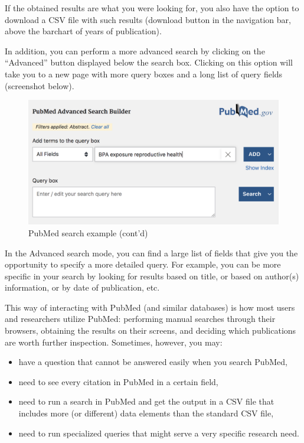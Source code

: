 \documentclass[
]{book}
\begin{document}
If the obtained results are what you were looking for, you also have the option
to download a CSV file with such results (download button in the navigation bar,
above the barchart of years of publication).

In addition, you can perform a more advanced search by clicking on the
``Advanced'' button displayed below the search box. Clicking on this option
will take you to a new page with more query boxes and a long list of query
fields (screenshot below).

\begin{figure}

{\centering \includegraphics[width=0.7\linewidth]{images/api/pubmed-search3} 

}

\caption{PubMed search example (cont'd)}\label{fig:unnamed-chunk-146}
\end{figure}

In the Advanced search mode, you can find a large list of fields that give you
the opportunity to specify a more detailed query. For example, you can be more
specific in your search by looking for results based on title, or based on
author(s) information, or by date of publication, etc.

This way of interacting with PubMed (and similar databases) is how most
users and researchers utilize PubMed: performing manual searches through their
browsers, obtaining the results on their screens, and deciding which
publications are worth further inspection. Sometimes, however, you may:

\begin{itemize}
\item
  have a question that cannot be answered easily when you search PubMed,
\item
  need to see every citation in PubMed in a certain field,
\item
  need to run a search in PubMed and get the output in a CSV file that
  includes more (or different) data elements than the standard CSV file,
\item
  need to run specialized queries that might serve a very specific research
  need.
\end{itemize}
\end{document}
